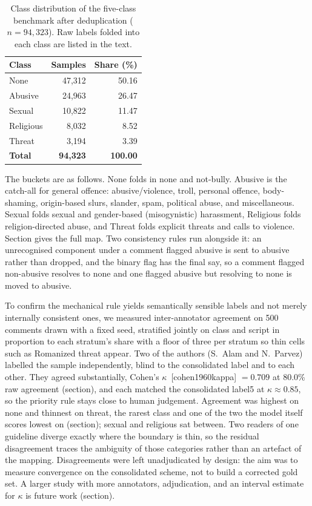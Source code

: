 \documentclass[11pt,a4paper]{article}
\def\citep#1{[#1]}%
\def\Cref#1{Section}%
\def\cref#1{section}%
\def\texttt#1{#1}%
\def\emph#1{#1}%
\begin{document}
\begin{table}[!htbp]
\centering
\caption{Class distribution of the five-class benchmark after deduplication ($n = 94{,}323$). Raw labels folded into each class are listed in the text.}
\label{tab:classes}
\small
\begin{tabular}{@{}lrr@{}}
\toprule
\textbf{Class} & \textbf{Samples} & \textbf{Share (\%)} \\
\midrule
None & 47{,}312 & 50.16 \\
Abusive & 24{,}963 & 26.47 \\
Sexual & 10{,}822 & 11.47 \\
Religious & 8{,}032 & 8.52 \\
Threat & 3{,}194 & 3.39 \\
\midrule
\textbf{Total} & \textbf{94{,}323} & \textbf{100.00} \\
\bottomrule
\end{tabular}
\end{table}

The buckets are as follows. \emph{None} folds in \texttt{none} and \texttt{not-bully}. \emph{Abusive} is the catch-all for general offence: abusive/violence, troll, personal offence, body-shaming, origin-based slurs, slander, spam, political abuse, and miscellaneous. \emph{Sexual} folds sexual and gender-based (misogynistic) harassment, \emph{Religious} folds religion-directed abuse, and \emph{Threat} folds explicit threats and calls to violence. \Cref{tab:consolidation} gives the full map. Two consistency rules run alongside it: an unrecognised component under a comment flagged abusive is sent to \emph{abusive} rather than dropped, and the binary flag has the final say, so a comment flagged non-abusive resolves to \emph{none} and one flagged abusive but resolving to \emph{none} is moved to \emph{abusive}.

To confirm the mechanical rule yields semantically sensible labels and not merely internally consistent ones, we measured inter-annotator agreement on 500 comments drawn with a fixed seed, stratified jointly on class and script in proportion to each stratum's share with a floor of three per stratum so thin cells such as Romanized \emph{threat} appear. Two of the authors (S.\ Alam and N.\ Parvez) labelled the sample independently, blind to the consolidated label and to each other. They agreed substantially, Cohen's $\kappa$~\citep{cohen1960kappa} $= 0.709$ at 80.0\% raw agreement (\cref{tab:iaa}), and each matched the consolidated \texttt{label5} at $\kappa \approx 0.85$, so the priority rule stays close to human judgement. Agreement was highest on \emph{none} and thinnest on \emph{threat}, the rarest class and one of the two the model itself scores lowest on (\cref{sec:perclass-results}); \emph{sexual} and \emph{religious} sat between. Two readers of one guideline diverge exactly where the boundary is thin, so the residual disagreement traces the ambiguity of those categories rather than an artefact of the mapping. Disagreements were left unadjudicated by design: the aim was to measure convergence on the consolidated scheme, not to build a corrected gold set. A larger study with more annotators, adjudication, and an interval estimate for $\kappa$ is future work (\cref{sec:limitations}).
\end{document}
